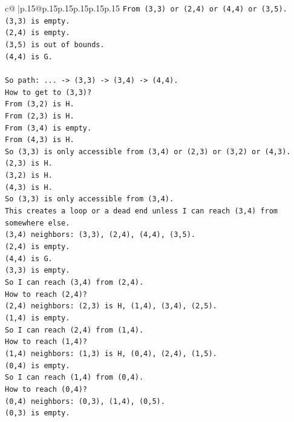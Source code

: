 \documentclass{article}
\begin{document}
{\begin{supertabular}{c@{$\;$}|p{.15\linewidth}@{}p{.15\linewidth}p{.15\linewidth}p{.15\linewidth}p{.15\linewidth}p{.15\linewidth}}
{{{\texttt{From (3,3) or (2,4) or (4,4) or (3,5).} \\
\texttt{(3,3) is empty.} \\
\texttt{(2,4) is empty.} \\
\texttt{(3,5) is out of bounds.} \\
\texttt{(4,4) is G.} \\
\\ 
\texttt{So path: ... {-}> (3,3) {-}> (3,4) {-}> (4,4).} \\
\texttt{How to get to (3,3)?} \\
\texttt{From (3,2) is H.} \\
\texttt{From (2,3) is H.} \\
\texttt{From (3,4) is empty.} \\
\texttt{From (4,3) is H.} \\
\texttt{So (3,3) is only accessible from (3,4) or (2,3) or (3,2) or (4,3).} \\
\texttt{(2,3) is H.} \\
\texttt{(3,2) is H.} \\
\texttt{(4,3) is H.} \\
\texttt{So (3,3) is only accessible from (3,4).} \\
\texttt{This creates a loop or a dead end unless I can reach (3,4) from somewhere else.} \\
\texttt{(3,4) neighbors: (3,3), (2,4), (4,4), (3,5).} \\
\texttt{(2,4) is empty.} \\
\texttt{(4,4) is G.} \\
\texttt{(3,3) is empty.} \\
\texttt{So I can reach (3,4) from (2,4).} \\
\texttt{How to reach (2,4)?} \\
\texttt{(2,4) neighbors: (2,3) is H, (1,4), (3,4), (2,5).} \\
\texttt{(1,4) is empty.} \\
\texttt{So I can reach (2,4) from (1,4).} \\
\texttt{How to reach (1,4)?} \\
\texttt{(1,4) neighbors: (1,3) is H, (0,4), (2,4), (1,5).} \\
\texttt{(0,4) is empty.} \\
\texttt{So I can reach (1,4) from (0,4).} \\
\texttt{How to reach (0,4)?} \\
\texttt{(0,4) neighbors: (0,3), (1,4), (0,5).} \\
\texttt{(0,3) is empty.} \\
}}}
\end{supertabular}}
\end{document}
